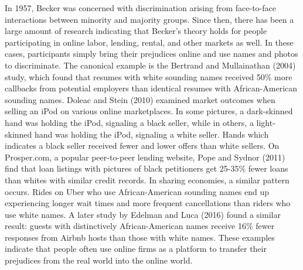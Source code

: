 In 1957, Becker was concerned with discrimination arising from face-to-face interactions between minority and majority groups. Since then, there has been a large amount of research indicating that Becker's theory holds for people participating in online labor, lending, rental, and other markets as well. In these cases, participants simply bring their prejudices online and use names and photos to discriminate. The canonical example is the Bertrand and Mullainathan (2004) study, which found that resumes with white sounding names received 50\% more callbacks from potential employers than identical resumes with African-American sounding names.\cite{bertrand} Doleac and Stein (2010) examined market outcomes when selling an iPod on various online marketplaces. In some pictures, a dark-skinned hand was holding the iPod, signaling a black seller, while in others, a light-skinned hand was holding the iPod, signaling a white seller.\cite{doleac} Hands which indicates a black seller received fewer and lower offers than white sellers. On Prosper.com, a popular peer-to-peer lending website, Pope and Sydnor (2011) find that loan listings with pictures of black petitioners get 25-35\% fewer loans than whites with similar credit records.\cite{pope} In sharing economies, a similar pattern occurs. Rides on Uber who use African-American sounding names end up experiencing longer wait times and more frequent cancellations than riders who use white names.\cite{knittel} A later study by Edelman and Luca (2016) found a similar result: guests with distinctively African-American names receive 16\% fewer responses from Airbnb hosts than those with white names.\cite{edelman2} These examples indicate that people often use online firms as a platform to transfer their prejudices from the real world into the online world.   











